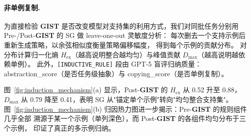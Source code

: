 \documentclass[11pt]{article}
\newcommand{\gist}{\textbf{GIST}}
\begin{document}
\paragraph{非单例复制.}
为直接检验 \gist{} 是否改变模型对支持集的利用方式，我们对同批任务分别用
Pre-/Post-\gist{} 的 SG 做 leave-one-out 灵敏度分析：
每次删去一个支持示例后重新生成策略，以余弦相似度衡量策略偏移幅度，
得到每个示例的贡献分布。
对分布计算归一化熵 $H_{\mathrm{ex}}$（越高说明整合越均匀）与峰值贡献 $D_{\mathrm{max}}$（越高说明越依赖单例）。
此外，\texttt{[INDUCTIVE\_RULE]} 段由 GPT-5 盲评归纳质量：
abstraction\_score（是否任务级抽象）与 copying\_score（是否单例复制）。

图~\ref{fig:induction_mechanism}(a) 显示，Post-\gist{} 的 $H_{\mathrm{ex}}$ 从 0.52 升至 0.88，
$D_{\mathrm{max}}$ 从 0.79 降至 0.41，表明 SG 从"锚定单个示例"转向"均匀整合支持集"。
图~\ref{fig:induction_mechanism}(b) 归因热力图进一步揭示：Pre-\gist{} 的规则组件几乎全部
溯源于某一个示例（单列深色），而 Post-\gist{} 的各组件均匀分布于三个示例，
印证了真正的多示例归纳。
\end{document}
